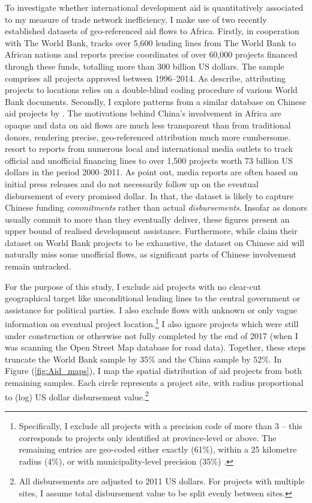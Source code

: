 \documentclass[11pt, oneside]{article}   	%
\let\oldref\ref
\renewcommand{\ref}[1]{(\oldref{#1})}
\begin{document}
To investigate whether international development aid is quantitatively associated to my measure of trade network inefficiency, I make use of two recently established datasets of geo-referenced aid flows to Africa. Firstly,  \cite{AidData_WorldBankGeocoded_2017} in cooperation with The World Bank, tracks over 5,600 lending lines from The World Bank to African nations and reports precise coordinates of over 60,000 projects financed through these funds, totalling more than 300 billion US dollars. The sample comprises all projects approved between 1996--2014. As \cite{Strandow_UCDPAidDataCodebook_2011} describe, attributing projects to locations relies on a double-blind coding procedure of various World Bank documents. Secondly, I explore patterns from a  similar database on Chinese aid projects by \cite{Strange_TrackingUnderreportedFinancial_2017}. The motivations behind China's involvement in Africa are opaque and data on aid flows are much less transparent than from traditional donors, rendering precise, geo-referenced attribution much more cumbersome. \citeauthor{Strange_TrackingUnderreportedFinancial_2017} resort to reports from numerous local and international media outlets to track official and unofficial financing lines to over 1,500 projects worth 73 billion US dollars in the period 2000--2011. As \citeauthor{Strange_TrackingUnderreportedFinancial_2017} point out, media reports are often based on initial press releases and do not necessarily follow up on the eventual disbursement of every promised dollar. In that, the dataset is likely to capture Chinese funding \emph{commitments} rather than actual \emph{disbursements}. Insofar as donors usually commit to more than they eventually deliver, these figures present an upper bound of realised development assistance. Furthermore, while \cite{AidData_WorldBankGeocoded_2017} claim their dataset on World Bank projects to be exhaustive, the dataset on Chinese aid will naturally miss some unofficial flows, as significant parts of Chinese involvement remain untracked.

For the purpose of this study, I exclude aid projects with no clear-cut geographical target like unconditional lending lines to the central government or assistance for political parties. I also exclude flows with unknown or only vague information on eventual project location.\footnote{Specifically, I exclude all projects with a precision code of more than 3 -- this corresponds to projects only identified at province-level or above. The remaining entries are geo-coded either exactly (61\%), within a 25 kilometre radius (4\%), or with municipality-level precision (35\%) \citep{Strandow_UCDPAidDataCodebook_2011}.} I also ignore projects which were still under construction or otherwise not fully completed by the end of 2017 (when I was scanning the Open Street Map database for road data). Together, these steps truncate the World Bank sample by 35\% and the China sample by 52\%. In Figure \ref{fig:Aid_maps}, I map the spatial distribution of aid projects from both remaining samples. Each circle represents a project site, with radius proportional to (log) US dollar disbursement value.\footnote{All disbursements are adjusted to 2011 US dollars. For projects with multiple sites, I assume total disbursement value to be split evenly between sites.}
\end{document}
